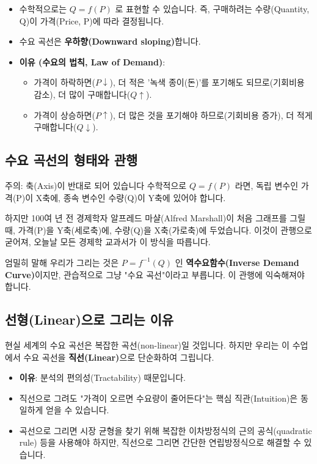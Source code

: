 \documentclass[11pt,a4paper]{article}
\theoremstyle{definition}
\begin{document}
\begin{itemize}
    \item 수학적으로는 $Q = f(P)$ 로 표현할 수 있습니다. 즉, 구매하려는 수량(Quantity, Q)이 가격(Price, P)에 따라 결정됩니다.
    \item 수요 곡선은 \textbf{우하향(Downward sloping)}합니다.
    \item \textbf{이유 (수요의 법칙, Law of Demand)}:
        \begin{itemize}
            \item 가격이 하락하면($P \downarrow$), 더 적은 '녹색 종이(돈)'를 포기해도 되므로(기회비용 감소), 더 많이 구매합니다($Q \uparrow$).
            \item 가격이 상승하면($P \uparrow$), 더 많은 것을 포기해야 하므로(기회비용 증가), 더 적게 구매합니다($Q \downarrow$).
        \end{itemize}
\end{itemize}

\subsection{수요 곡선의 형태와 관행}

\begin{keypointbox}{주의: 축(Axis)이 반대로 되어 있습니다}
    수학적으로 $Q = f(P)$ 라면, 독립 변수인 가격(P)이 X축에, 종속 변수인 수량(Q)이 Y축에 있어야 합니다.

    하지만 100여 년 전 경제학자 알프레드 마샬(Alfred Marshall)이 처음 그래프를 그릴 때, 가격(P)을 Y축(세로축)에, 수량(Q)을 X축(가로축)에 두었습니다.
    이것이 관행으로 굳어져, 오늘날 모든 경제학 교과서가 이 방식을 따릅니다.

    엄밀히 말해 우리가 그리는 것은 $P = f^{-1}(Q)$ 인 \textbf{역수요함수(Inverse Demand Curve)}이지만, 관습적으로 그냥 "수요 곡선"이라고 부릅니다. 이 관행에 익숙해져야 합니다.
\end{keypointbox}

\subsection{선형(Linear)으로 그리는 이유}

현실 세계의 수요 곡선은 복잡한 곡선(non-linear)일 것입니다.
하지만 우리는 이 수업에서 수요 곡선을 \textbf{직선(Linear)}으로 단순화하여 그립니다.

\begin{itemize}
    \item \textbf{이유}: 분석의 편의성(Tractability) 때문입니다.
    \item 직선으로 그려도 "가격이 오르면 수요량이 줄어든다"는 핵심 직관(Intuition)은 동일하게 얻을 수 있습니다.
    \item 곡선으로 그리면 시장 균형을 찾기 위해 복잡한 이차방정식의 근의 공식(quadratic rule) 등을 사용해야 하지만, 직선으로 그리면 간단한 연립방정식으로 해결할 수 있습니다.
\end{itemize}
\end{document}
